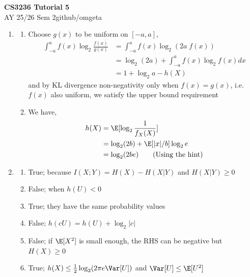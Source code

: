 \documentclass[12pt, a4paper]{article}
\newcommand{\mytitle}{CS3236 Tutorial 5}
\newcommand{\myauthor}{github/omgeta}
\newcommand{\mydate}{AY 25/26 Sem 2}
\begin{document}
\raggedright
\footnotesize
\begin{center}
{\normalsize{\textbf{\mytitle}}} \\
{\footnotesize{\mydate\hspace{2pt}\textemdash\hspace{2pt}\myauthor}}
\end{center}
\begin{enumerate}
  \item 
    \begin{enumerate}
      \item Choose $g(x)$ to be uniform on $[-a, a]$,
        \begin{align*}
          \int^a_{-a} f(x)\log_2 \frac{f(x)}{g(x)} &= \int^a_{-a}f(x)\log_2(2a\;f(x))\\ 
                                                   &= \log_2(2a) + \int^a_{-a}f(x)\log_2f(x)dx\\ 
                                                   &= 1 + \log_2a - h(X)
        \end{align*}
        and by KL divergence non-negativity only when $f(x)=g(x)$, i.e. $f(x)$ also uniform, we satisfy the upper bound requirement
      
      \item We have,
        \begin{align*}
          h(X) &= \E[\log_{2} \frac{1}{f_X(X)}]\\ 
               &= \log_2(2b) + \E[|x|/b]\log_2 e\\ 
               &= \log_2(2be)\tag*{(Using the hint)}
        \end{align*}
    \end{enumerate}

  \item 
    \begin{enumerate}
      \item True; because $I(X;Y) = H(X) - H(X|Y)$ and $H(X|Y) \geq 0$
      \item False; when $h(U) < 0$
      \item True; they have the same probability values
      \item False; $h(cU) = h(U) + \log_2|c|$
      \item False; if $\E[X^2]$ is small enough, the RHS can be negative but $H(X) \geq 0$
      \item True; $h(X) \leq \frac{1}{2}\log_2(2\pi e\Var[U])$ and $\Var[U] \leq \E[U^2]$
    \end{enumerate}


\end{enumerate}
\end{document}
